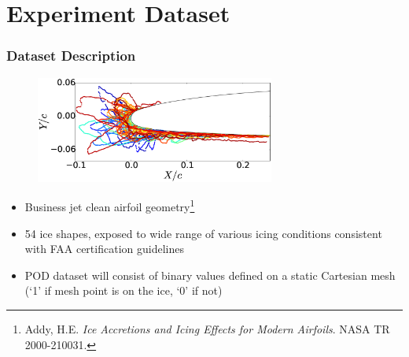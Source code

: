 \documentclass[9pt]{beamer}
\begin{document}
\section{Experiment Dataset}
\label{sec-4}
\begin{frame}
\frametitle{Dataset Description}
\label{sec-4-1}


\begin{figure}
  \centering
  \includegraphics[width=0.7\textwidth]{Dataset}
\end{figure}

\begin{itemize}
\item Business jet clean airfoil geometry\footnote{Addy, H.E. \emph{Ice Accretions and Icing Effects for Modern Airfoils}. NASA TR 2000-210031.
 }
\item 54 ice shapes, exposed to wide range of various icing conditions
  consistent with FAA certification guidelines
\item POD dataset will consist of binary values defined on a static
  Cartesian mesh (`1' if mesh point is on the ice, `0' if not)
\end{itemize}
\end{frame}
\end{document}

